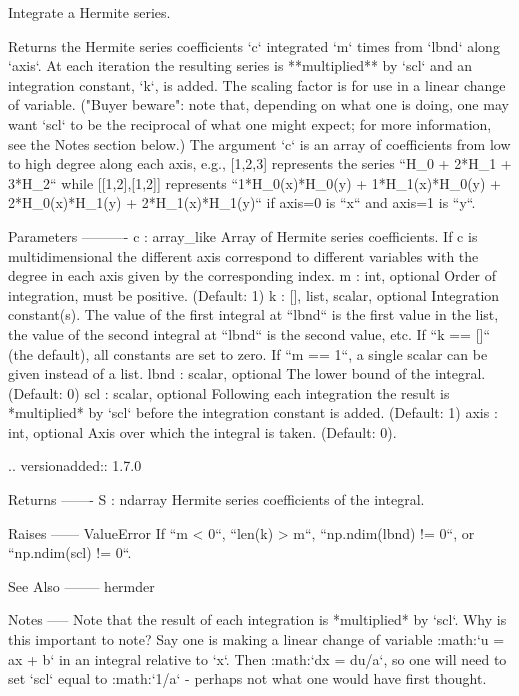 \begin{DoxyVerb}Integrate a Hermite series.

Returns the Hermite series coefficients `c` integrated `m` times from
`lbnd` along `axis`. At each iteration the resulting series is
**multiplied** by `scl` and an integration constant, `k`, is added.
The scaling factor is for use in a linear change of variable.  ("Buyer
beware": note that, depending on what one is doing, one may want `scl`
to be the reciprocal of what one might expect; for more information,
see the Notes section below.)  The argument `c` is an array of
coefficients from low to high degree along each axis, e.g., [1,2,3]
represents the series ``H_0 + 2*H_1 + 3*H_2`` while [[1,2],[1,2]]
represents ``1*H_0(x)*H_0(y) + 1*H_1(x)*H_0(y) + 2*H_0(x)*H_1(y) +
2*H_1(x)*H_1(y)`` if axis=0 is ``x`` and axis=1 is ``y``.

Parameters
----------
c : array_like
    Array of Hermite series coefficients. If c is multidimensional the
    different axis correspond to different variables with the degree in
    each axis given by the corresponding index.
m : int, optional
    Order of integration, must be positive. (Default: 1)
k : {[], list, scalar}, optional
    Integration constant(s).  The value of the first integral at
    ``lbnd`` is the first value in the list, the value of the second
    integral at ``lbnd`` is the second value, etc.  If ``k == []`` (the
    default), all constants are set to zero.  If ``m == 1``, a single
    scalar can be given instead of a list.
lbnd : scalar, optional
    The lower bound of the integral. (Default: 0)
scl : scalar, optional
    Following each integration the result is *multiplied* by `scl`
    before the integration constant is added. (Default: 1)
axis : int, optional
    Axis over which the integral is taken. (Default: 0).

    .. versionadded:: 1.7.0

Returns
-------
S : ndarray
    Hermite series coefficients of the integral.

Raises
------
ValueError
    If ``m < 0``, ``len(k) > m``, ``np.ndim(lbnd) != 0``, or
    ``np.ndim(scl) != 0``.

See Also
--------
hermder

Notes
-----
Note that the result of each integration is *multiplied* by `scl`.
Why is this important to note?  Say one is making a linear change of
variable :math:`u = ax + b` in an integral relative to `x`.  Then
:math:`dx = du/a`, so one will need to set `scl` equal to
:math:`1/a` - perhaps not what one would have first thought.


\end{DoxyVerb}
